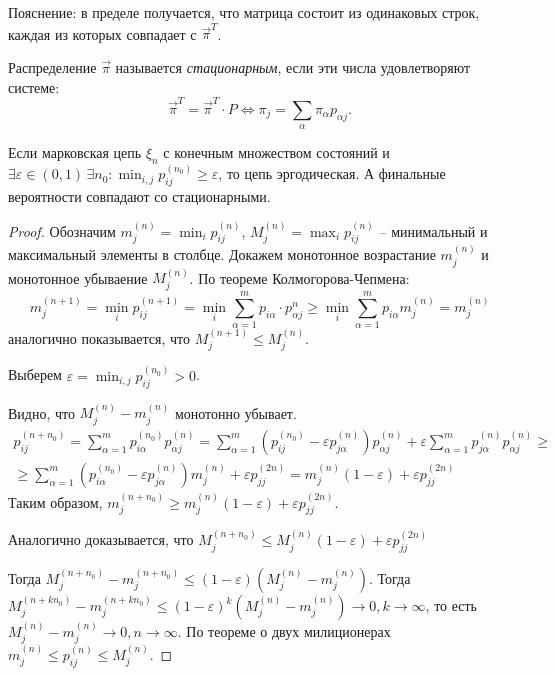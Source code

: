 Пояснение: в пределе получается, что матрица состоит из одинаковых строк, каждая из
которых совпадает с $\vec{\pi}^T$.

\begin{definition}
  Распределение $\vec{\pi}$ называется \emph{стационарным}, если эти числа удовлетворяют
  системе:
  \[
    \vec{\pi}^T = \vec{\pi}^T \cdot P
    \Leftrightarrow 
    \pi_j = \sum_\alpha \pi_\alpha p_{\alpha j}.
  \]
\end{definition}

\begin{theorem}
  Если марковская цепь $\xi_n$ с конечным множеством состояний и $\exists \varepsilon\in(0, 1) \,
  \exists n_0 : \min_{i, j} p_{ij}^{(n_0)} \geqslant \varepsilon$, то цепь эргодическая.
  А финальные вероятности совпадают со стационарными.
\end{theorem}
\begin{proof}
  Обозначим $m_j^{(n)} = \min_i p_{ij}^{(n)}$, $M_j^{(n)} = \max_i p_{ij}^{(n)}$ -- минимальный 
  и максимальный элементы в столбце. Докажем монотонное возрастание $m_{j}^{(n)}$ и монотонное
  убываение $M_j^{(n)}$. По теореме Колмогорова-Чепмена:
  \[
    m_{j}^{(n+1)} = \min_i p_{ij}^{(n+1)}
    = \min_i \sum_{\alpha=1}^m p_{i\alpha} \cdot p_{\alpha j}^{n} \geqslant 
    \min_i \sum_{\alpha=1}^m p_{i \alpha} m_j^{(n)}
    = m_j^{(n)}
  \]
  аналогично показывается, что $M_{j}^{(n+1)} \leqslant M_j^{(n)}$.


  Выберем $\varepsilon = \min_{i, j} p_{ij}^{(n_0)} > 0$.

  Видно, что $M_j^{(n)}-m_j^{(n)}$ монотонно убывает.
  \begin{multline*}
    p_{ij}^{(n+n_0)} = \sum_{\alpha=1}^m p_{i\alpha}^{(n_0)} p_{\alpha j}^{(n)}
    = \sum_{\alpha=1}^m (p_{ij}^{(n_0)} - \varepsilon p_{j \alpha}^{(n)}) p_{\alpha j}^{(n)}
      + \varepsilon \sum_{\alpha=1}^m p_{j \alpha}^{(n)} p_{\alpha j}^{(n)} \geqslant \\
    \geqslant \sum_{\alpha=1}^m (p_{i\alpha}^{(n_0)} - \varepsilon p_{j\alpha}^{(n)}) m_j^{(n)}
      + \varepsilon p_{jj}^{(2n)}
    = m_j^{(n)} (1-\varepsilon) + \varepsilon p_{jj}^{(2n)}
  \end{multline*}
  Таким образом, $m_j^{(n+n_0)} \geqslant m_j^{(n)} (1-\varepsilon) + \varepsilon p_{jj}^{(2n)}$.
  
  Аналогично доказывается, что $M_j^{(n+n_0)} \leqslant M_j^{(n)} (1-\varepsilon) + \varepsilon p_{jj}^{(2n)}$
  
  Тогда $M_{j}^{(n+n_0)} - m_j^{(n+n_0)} \leqslant (1-\varepsilon) (M_j^{(n)} - m_j^{(n)})$. 
  Тогда $M_j^{(n+kn_0)} - m_j^{(n+kn_0)} \leqslant (1-\varepsilon)^k (M_j^{(n)} - m_j^{(n)}) \to 0, k\to \infty$, то есть $M_{j}^{(n)} - m_j^{(n)} \to 0, n \to \infty$. По теореме о двух милиционерах
  $m_j^{(n)} \leqslant p_{ij}^{(n)} \leqslant M_j^{(n)}$.
  
\end{proof}

